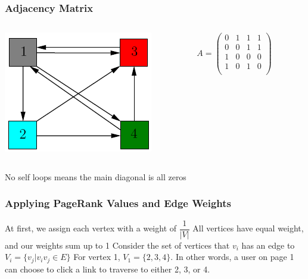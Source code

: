 \documentclass{beamer}
\begin{document}
\begin{frame}
\frametitle{Adjacency Matrix}
\begin{columns}
    \begin{column}{0.5\textwidth}
        \centering
        \includegraphics[width=\textwidth]{unweighted.png}
    \end{column}
    \begin{column}{0.5\textwidth}
        \centering
        {\Large$A = \begin{pmatrix}
            0 & 1 & 1 & 1\\
            0 & 0 & 1 & 1\\
            1 & 0 & 0 & 0\\
            1 & 0 & 1 & 0\\
        \end{pmatrix}$}
    \end{column}
\end{columns}
\begin{outline}
    \1 No self loops means the main diagonal is all zeros
\end{outline}
\end{frame}
\begin{frame}[t]
\frametitle{Applying PageRank Values and Edge Weights}
\begin{outline}
    \1 At first, we assign each vertex with a weight of $\dfrac{1}{|V|}$
        \2 All vertices have equal weight, and our weights sum up to 1
    \1 Consider the set of vertices that $v_i$ has an edge to 
        \2 $V_i = \{v_j | v_iv_j \in E\}$
    \1 For vertex 1, $V_1 = \{2, 3, 4\}$. In other words, a user on page 1 can choose to click a link to traverse to either 2, 3, or 4.
    \1 
\end{outline}
\end{frame}
\end{document}
